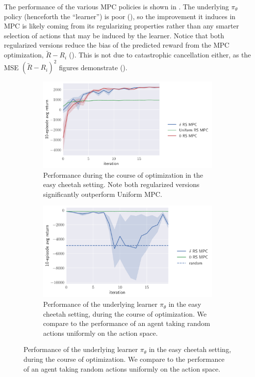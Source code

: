 \documentclass{article}
\begin{document}
The performance of the various MPC policies is shown in . The underlying $\pi_\theta$ policy (henceforth the ``learner'') is poor (), so the improvement it induces in MPC is likely coming from its regularizing properties rather than any smarter selection of actions that may be induced by the learner.
%
Notice that both regularized versions reduce the bias of the predicted reward from the MPC optimization, $\tilde R - R_i$ (). This is not due to catastrophic cancellation either, as the MSE $(\tilde R - R_i)^2$ figures demonstrate ().

\begin{figure}[!ht]
  \centering

  \begin{subfigure}[b]{0.48\columnwidth}
    \centering
    \includegraphics[width=\textwidth]{easy-cheetah-return.pdf}
    \caption{%
      Performance during the course of optimization in the easy cheetah
      setting. Note both regularized versions significantly outperform Uniform
      MPC.
    }\label{fig:easy-cheetah-return}
  \end{subfigure}\hspace{1em}
  \begin{subfigure}[b]{0.48\columnwidth}
    \centering
    \includegraphics[width=\textwidth]{easy-cheetah-learner-return.pdf}
    \caption{%
      Performance of the underlying learner $\pi_\theta$ in the easy cheetah
      setting, during the course of optimization. We compare to the performance
      of an agent taking random actions uniformly on the action space.
    }\label{fig:easy-cheetah-learner}
  \end{subfigure}


\end{figure}
\end{document}
